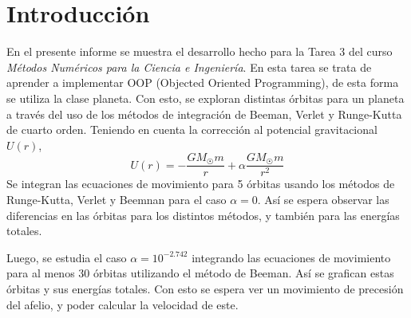 \documentclass[letterpaper,oneside]{article}
\begin{document}
	
\templatePortrait

\templatePagecfg



\templateFinalcfg

\section{Introducción}
En el presente informe se muestra el desarrollo hecho para la Tarea 3 del curso \textit{Métodos Numéricos para la Ciencia e Ingeniería}. En esta tarea se trata de aprender a implementar OOP (Objected Oriented Programming), de esta forma se utiliza la clase planeta. Con esto, se exploran distintas órbitas para un planeta a través del uso de los métodos de integración de Beeman, Verlet y Runge-Kutta de cuarto orden. Teniendo en cuenta la corrección al potencial gravitacional $U(r)$, 
$$U(r)=-\frac{GM_{\astrosun}m}{r}+\alpha \frac{GM_\astrosun m}{r^2}$$
Se integran las ecuaciones de movimiento para 5 órbitas usando los métodos de Runge-Kutta, Verlet y Beemnan para el caso $\alpha=0$. Así se espera observar las diferencias en las órbitas para los distintos métodos, y también para las energías totales. 

Luego, se estudia el caso $\alpha = 10^{-2.742}$ integrando las ecuaciones de movimiento para al menos 30 órbitas utilizando el método de Beeman. Así se grafican estas órbitas y sus energías totales. Con esto se espera ver un movimiento de precesión del afelio, y poder calcular la velocidad de este.
\end{document}
